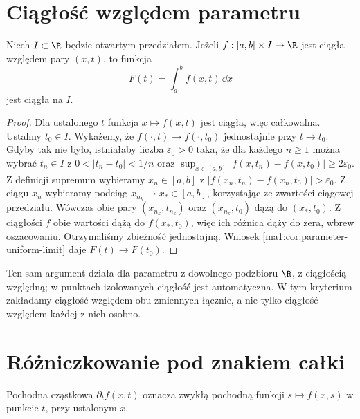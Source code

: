 \section{Ciągłość względem parametru}
\begin{twierdzenie}
\label{ma1:thm:parameter-continuity}
Niech $I\subset\R$ będzie otwartym przedziałem. Jeżeli $f:[a,b]\times I\to\R$ jest ciągła względem pary $(x,t)$, to funkcja
\[
 F(t)=\int_a^b f(x,t)\,\dd x
\]
jest ciągła na $I$.
\end{twierdzenie}
\begin{proof}
Dla ustalonego $t$ funkcja $x\mapsto f(x,t)$ jest ciągła, więc całkowalna. Ustalmy $t_0\in I$. Wykażemy, że $f(\cdot,t)\to f(\cdot,t_0)$ jednostajnie przy $t\to t_0$. Gdyby tak nie było, istniałaby liczba $\varepsilon_0>0$ taka, że dla każdego $n\ge1$ można wybrać $t_n\in I$ z $0<|t_n-t_0|<1/n$ oraz $\sup_{x\in[a,b]}|f(x,t_n)-f(x,t_0)|\ge2\varepsilon_0$. Z definicji supremum wybieramy $x_n\in[a,b]$ z $|f(x_n,t_n)-f(x_n,t_0)|>\varepsilon_0$. Z ciągu $x_n$ wybieramy podciąg $x_{n_k}\to x_*\in[a,b]$, korzystając ze zwartości ciągowej przedziału. Wówczas obie pary $(x_{n_k},t_{n_k})$ oraz $(x_{n_k},t_0)$ dążą do $(x_*,t_0)$. Z ciągłości $f$ obie wartości dążą do $f(x_*,t_0)$, więc ich różnica dąży do zera, wbrew oszacowaniu. Otrzymaliśmy zbieżność jednostajną. Wniosek \ref{ma1:cor:parameter-uniform-limit} daje $F(t)\to F(t_0)$.
\end{proof}
Ten sam argument działa dla parametru z dowolnego podzbioru $\R$, z ciągłością względną; w punktach izolowanych ciągłość jest automatyczna. W tym kryterium zakładamy ciągłość względem obu zmiennych łącznie, a nie tylko ciągłość względem każdej z nich osobno.

\section{Różniczkowanie pod znakiem całki}
Pochodna cząstkowa $\partial_t f(x,t)$ oznacza zwykłą pochodną funkcji $s\mapsto f(x,s)$ w punkcie $t$, przy ustalonym $x$.

